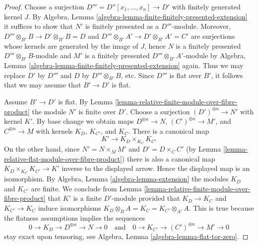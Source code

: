 \begin{proof}
Choose a surjection $D''' = D''[x_1, \ldots, x_n] \to D'$ with
finitely generated kernel $J$.
By Algebra, Lemma \ref{algebra-lemma-finite-finitely-presented-extension}
it suffices to show that $N'$ is finitely presented as a
$D'''$-module. Moreover, $D''' \otimes_{B'} B \to D' \otimes_{B'} B = D$
and $D''' \otimes_{B'} A' \to D' \otimes_{B'} A' = C'$ are surjections
whose kernels are generated by the image of $J$, hence $N$ is a
finitely presented $D''' \otimes_{B'} B$-module and
$M'$ is a finitely presented $D''' \otimes_{B'} A'$-module by
Algebra, Lemma \ref{algebra-lemma-finite-finitely-presented-extension}
again. Thus we may replace $D'$ by $D'''$ and $D$ by
$D''' \otimes_{B'} B$, etc. Since $D'''$ is
flat over $B'$, it follows that we may assume that $B' \to D'$ is flat.

\medskip\noindent
Assume $B' \to D'$ is flat.
By Lemma \ref{lemma-relative-finite-module-over-fibre-product}
the module $N'$ is finite over $D'$. Choose a surjection
$(D')^{\oplus n} \to N'$ with kernel $K'$. By base change we obtain maps
$D^{\oplus n} \to N$, $(C')^{\oplus n} \to M'$, and $C^{\oplus n} \to M$
with kernels $K_D$, $K_{C'}$, and $K_C$. There is a canonical map
$$
K' \longrightarrow K_D \times_{K_C} K_{C'}
$$
On the other hand, since $N' = N \times_M M'$ and
$D' = D \times_C C'$ (by
Lemma \ref{lemma-relative-flat-module-over-fibre-product})
there is also a
canonical map $K_D \times_{K_C} K_{C'} \to K'$ inverse to the displayed
arrow. Hence the displayed map is an isomorphism. By
Algebra, Lemma \ref{algebra-lemma-extension}
the modules $K_D$ and $K_{C'}$ are finite. We conclude from
Lemma \ref{lemma-relative-finite-module-over-fibre-product}
that $K'$ is a finite $D'$-module provided that $K_D \to K_C$ and
$K_{C'} \to K_C$ induce isomorphisms
$K_D \otimes_B A = K_C = K_{C'} \otimes_{A'} A$.
This is true because the flatness assumptions implies the sequences
$$
0 \to K_D \to D^{\oplus n} \to N \to 0
\quad\text{and}\quad
0 \to K_{C'} \to (C')^{\oplus n} \to M' \to 0
$$
stay exact upon tensoring, see
Algebra, Lemma \ref{algebra-lemma-flat-tor-zero}.
\end{proof}

